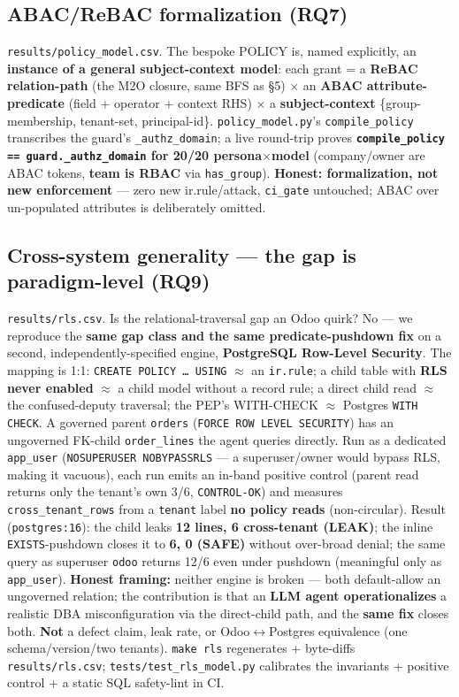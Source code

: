 \documentclass[runningheads]{llncs}
\newcommand{\code}[1]{\texttt{#1}}
\begin{document}
\subsection{ABAC/ReBAC formalization (RQ7)}
\code{results/policy_model.csv}. The bespoke POLICY is, named explicitly, an \textbf{instance of a general
subject-context model}: each grant = a \textbf{ReBAC relation-path} (the M2O closure, same BFS as \S5) $\times$ an
\textbf{ABAC attribute-predicate} (field + operator + context RHS) $\times$ a \textbf{subject-context}
\{group-membership, tenant-set, principal-id\}. \code{policy_model.py}'s \code{compile_policy} transcribes the
guard's \code{_authz_domain}; a live round-trip proves \textbf{\code{compile_policy == guard.\_authz\_domain} for
20/20 persona$\times$model} (company/owner are ABAC tokens, \textbf{team is RBAC} via \code{has_group}).
\textbf{Honest: formalization, not new enforcement} --- zero new ir.rule/attack, \code{ci_gate} untouched; ABAC
over un-populated attributes is deliberately omitted.

\subsection{Cross-system generality --- the gap is paradigm-level (RQ9)}
\code{results/rls.csv}. Is the relational-traversal gap an Odoo quirk? No --- we reproduce the \textbf{same gap
class and the same predicate-pushdown fix} on a second, independently-specified engine, \textbf{PostgreSQL
Row-Level Security}. The mapping is 1:1: \code{CREATE POLICY {\dots} USING} $\approx$ an \code{ir.rule}; a child
table with \textbf{RLS never enabled} $\approx$ a child model without a record rule; a direct child read $\approx$
the confused-deputy traversal; the PEP's WITH-CHECK $\approx$ Postgres \code{WITH CHECK}. A governed parent
\code{orders} (\code{FORCE ROW LEVEL SECURITY}) has an ungoverned FK-child \code{order\_lines} the agent queries
directly. Run as a dedicated \code{app\_user} (\code{NOSUPERUSER NOBYPASSRLS} --- a superuser/owner would bypass
RLS, making it vacuous), each run emits an in-band positive control (parent read returns only the tenant's own
3/6, \code{CONTROL-OK}) and measures \code{cross\_tenant\_rows} from a \code{tenant} label \textbf{no policy reads}
(non-circular). Result (\code{postgres:16}): the child leaks \textbf{12 lines, 6 cross-tenant (LEAK)}; the inline
\code{EXISTS}-pushdown closes it to \textbf{6, 0 (SAFE)} without over-broad denial; the same query as superuser
\code{odoo} returns 12/6 even under pushdown (meaningful only as \code{app\_user}). \textbf{Honest framing:} neither
engine is broken --- both default-allow an ungoverned relation; the contribution is that an \textbf{LLM agent
operationalizes} a realistic DBA misconfiguration via the direct-child path, and the \textbf{same fix} closes both.
\textbf{Not} a defect claim, leak rate, or Odoo$\leftrightarrow$Postgres equivalence (one schema/version/two
tenants). \code{make rls} regenerates + byte-diffs \code{results/rls.csv}; \code{tests/test\_rls\_model.py}
calibrates the invariants + positive control + a static SQL safety-lint in CI.
\end{document}
